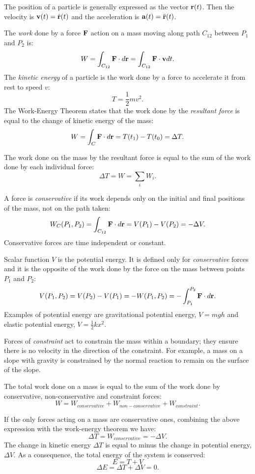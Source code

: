 
The position of a particle is generally expressed as the vector ${\bf r}(t)$. Then the velocity is ${\bf v}(t)=\dot{\bf r}(t)$ and the acceleration is ${\bf a}(t)=\ddot{\bf r}(t)$.

  
The {\em work} done by a force ${\bf F}$ action on a mass moving along path $C_{12}$ between $P_{1}$ and $P_{2}$ is:  
$$W=\int_{C_{12}}{\bf F} \cdot {d {\bf r}} = \int_{C_{12}}{\bf F}\cdot {\bf v} dt.$$
%
The {\em kinetic energy} of a particle is the work done by a force to accelerate it from rest to speed $v$: $$T = \frac{1}{2} m v^2.$$
%
The Work-Energy Theorem states that the work done by the {\em resultant force} is equal to the change of kinetic energy of the mass: 
$$W=\int_C {\bf F} \cdot {d {\bf r}}=T(t_{1})-T(t_{0}) = \Delta T.$$

The work done on the mass by the resultant force is equal to the sum of the work done by each individual force: 
$$ \Delta T = W = \sum_i W_i.$$

A force is {\em conservative} if its work depends only on the initial and final positions of the mass, not on the path taken:
$$W_{C}(P_1,P_2) = \int_{C_{12}}{\bf F} \cdot {d {\bf r}} = V(P_1) - V(P_2) = -\Delta V.$$
Conservative forces are time independent or constant.
  
Scalar function $V$ is the potential energy. It is defined only for {\em conservative} forces and it is the opposite of the work done by the force on the mass between points $P_1$ and $P_2$:
$$V(P_1,P_2) = V(P_2) - V(P_1) = - W(P_1,P_2) = - \int_{P_1}^{P_2} {\bf F}\cdot{d{\bf r}}.$$ 
Examples of potential energy are gravitational potential energy, $V = mgh$ and elastic potential energy, $V = \frac{1}{2}kx^2$.

Forces of {\em constraint} act to constrain the mass within a boundary; they ensure there is no velocity in the direction of the constraint. For example, a mass on a slope with gravity is constrained by the normal reaction to remain on the surface of the slope.

The total work done on a mass is equal to the sum of the work done by conservative, non-conservative and constraint forces:
$$ W = W_{conservative} + W_{non-conservative} + W_{constraint}.$$

If the only forces acting on a mass are conservative ones, combining the above expression with the work-energy theorem we have:
$$ \Delta T =  W_{conservative} = -\Delta V.$$
The change in kinetic energy $\Delta T$ is equal to minus the change in potential energy, $\Delta V$. As a consequence, the total energy of the system is conserved:
$$ E = T + V$$
$$\Delta E = \Delta T + \Delta V = 0. $$





